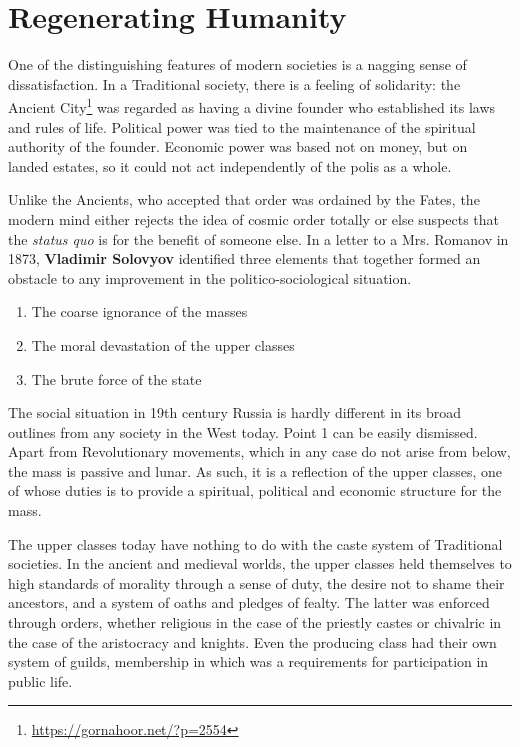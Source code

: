 \section{Regenerating Humanity}

One of the distinguishing features of modern societies is a nagging sense of dissatisfaction. In a Traditional society, there is a feeling of solidarity: the Ancient City\footnote{\url{https://gornahoor.net/?p=2554}} was regarded as having a divine founder who established its laws and rules of life. Political power was tied to the maintenance of the spiritual authority of the founder. Economic power was based not on money, but on landed estates, so it could not act independently of the polis as a whole.

Unlike the Ancients, who accepted that order was ordained by the Fates, the modern mind either rejects the idea of cosmic order totally or else suspects that the \emph{status quo} is for the benefit of someone else. In a letter to a Mrs. Romanov in 1873, \textbf{Vladimir Solovyov} identified three elements that together formed an obstacle to any improvement in the politico-sociological situation.

\begin{enumerate}


\item The coarse ignorance of the masses

\item The moral devastation of the upper classes

\item The brute force of the state
\end{enumerate}


The social situation in 19th century Russia is hardly different in its broad outlines from any society in the West today. Point 1 can be easily dismissed. Apart from Revolutionary movements, which in any case do not arise from below, the mass is passive and lunar. As such, it is a reflection of the upper classes, one of whose duties is to provide a spiritual, political and economic structure for the mass.

The upper classes today have nothing to do with the caste system of Traditional societies. In the ancient and medieval worlds, the upper classes held themselves to high standards of morality through a sense of duty, the desire not to shame their ancestors, and a system of oaths and pledges of fealty. The latter was enforced through orders, whether religious in the case of the priestly castes or chivalric in the case of the aristocracy and knights. Even the producing class had their own system of guilds, membership in which was a requirements for participation in public life.

